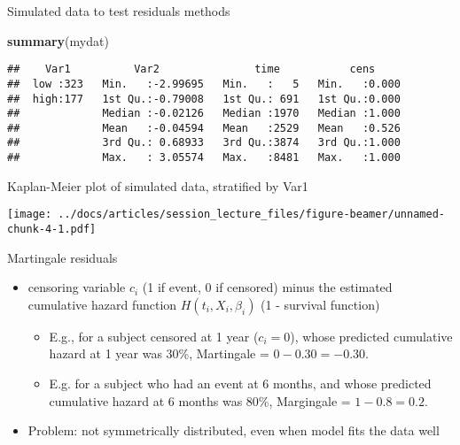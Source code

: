 \documentclass[
  ignorenonframetext,
]{beamer}
\newenvironment{Shaded}{\begin{snugshade}}{\end{snugshade}}
\newcommand{\KeywordTok}[1]{\textcolor[rgb]{0.13,0.29,0.53}{\textbf{#1}}}
\newcommand{\NormalTok}[1]{#1}
\providecommand{\tightlist}{%
  \setlength{\itemsep}{0pt}\setlength{\parskip}{0pt}}
\begin{document}
\begin{frame}[fragile]{Simulated data to test residuals methods}
\protect\hypertarget{simulated-data-to-test-residuals-methods}{}

\footnotesize

\begin{Shaded}
\begin{Highlighting}[]
\KeywordTok{summary}\NormalTok{(mydat)}
\end{Highlighting}
\end{Shaded}

\begin{verbatim}
##    Var1          Var2               time           cens      
##  low :323   Min.   :-2.99695   Min.   :   5   Min.   :0.000  
##  high:177   1st Qu.:-0.79008   1st Qu.: 691   1st Qu.:0.000  
##             Median :-0.02126   Median :1970   Median :1.000  
##             Mean   :-0.04594   Mean   :2529   Mean   :0.526  
##             3rd Qu.: 0.68933   3rd Qu.:3874   3rd Qu.:1.000  
##             Max.   : 3.05574   Max.   :8481   Max.   :1.000
\end{verbatim}

\end{frame}

\begin{frame}{Kaplan-Meier plot of simulated data, stratified by Var1}
\protect\hypertarget{kaplan-meier-plot-of-simulated-data-stratified-by-var1}{}

\texttt{[image: ../docs/articles/session\_lecture\_files/figure-beamer/unnamed-chunk-4-1.pdf]}

\end{frame}

\begin{frame}{Martingale residuals}
\protect\hypertarget{martingale-residuals}{}

\begin{itemize}
\tightlist
\item
  censoring variable \(c_i\) (1 if event, 0 if censored) minus the
  estimated cumulative hazard function \(H(t_i, X_i, \beta_i)\) (1 -
  survival function)

  \begin{itemize}
  \tightlist
  \item
    E.g., for a subject censored at 1 year (\(c_i=0\)), whose predicted
    cumulative hazard at 1 year was 30\%, Martingale =
    \(0 - 0.30 = -0.30\).
  \item
    E.g. for a subject who had an event at 6 months, and whose predicted
    cumulative hazard at 6 months was 80\%, Margingale =
    \(1 - 0.8 = 0.2\).
  \end{itemize}
\item
  Problem: not symmetrically distributed, even when model fits the data
  well
\end{itemize}

\end{frame}
\end{document}
